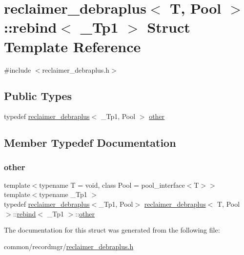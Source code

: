 \hypertarget{structreclaimer__debraplus_1_1rebind}{}\section{reclaimer\+\_\+debraplus$<$ T, Pool $>$\+:\+:rebind$<$ \+\_\+\+Tp1 $>$ Struct Template Reference}
\label{structreclaimer__debraplus_1_1rebind}


{\ttfamily \#include $<$reclaimer\+\_\+debraplus.\+h$>$}

\subsection*{Public Types}
\begin{DoxyCompactItemize}
\item 
typedef \hyperlink{classreclaimer__debraplus}{reclaimer\+\_\+debraplus}$<$ \+\_\+\+Tp1, Pool $>$ \hyperlink{structreclaimer__debraplus_1_1rebind_a3fafc41a7ffc8cb5236fd18bd30f9752}{other}
\end{DoxyCompactItemize}


\subsection{Member Typedef Documentation}
\mbox{\label{structreclaimer__debraplus_1_1rebind_a3fafc41a7ffc8cb5236fd18bd30f9752}} 
\subsubsection{\texorpdfstring{other}{other}}
{\footnotesize\ttfamily template$<$typename T  = void, class Pool  = pool\+\_\+interface$<$\+T$>$$>$ \\
template$<$typename \+\_\+\+Tp1 $>$ \\
typedef \hyperlink{classreclaimer__debraplus}{reclaimer\+\_\+debraplus}$<$\+\_\+\+Tp1, Pool$>$ \hyperlink{classreclaimer__debraplus}{reclaimer\+\_\+debraplus}$<$ T, Pool $>$\+::\hyperlink{structreclaimer__debraplus_1_1rebind}{rebind}$<$ \+\_\+\+Tp1 $>$\+::\hyperlink{structreclaimer__debraplus_1_1rebind_a3fafc41a7ffc8cb5236fd18bd30f9752}{other}}



The documentation for this struct was generated from the following file\+:\begin{DoxyCompactItemize}
\item 
common/recordmgr/\hyperlink{reclaimer__debraplus_8h}{reclaimer\+\_\+debraplus.\+h}\end{DoxyCompactItemize}
